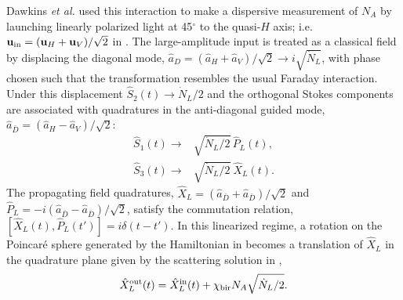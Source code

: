 \documentclass[preprint,aps,pra,onecolumn]{revtex4-1} %
\newcommand{\inp}{{\rm in}}
\newcommand{\chibir}{\chi_{\rm bir}}
\begin{document}

Dawkins {\em et al.} \cite{dawkins_dispersive_2011} used this interaction to make a dispersive measurement of $N_A$ by launching linearly polarized light at 45$^\circ$ to the quasi-$H$ axis; i.e. $\mbf{u}_\inp = (\mbf{u}_H + \mbf{u}_V )/\sqrt{2}$ in . The large-amplitude input is treated as a classical field by displacing the diagonal mode, $\hat{a}_D = (\hat{a}_H + \hat{a}_V)/\sqrt{2} \rightarrow i\sqrt{\dot{N}_L}$, with phase chosen such that the transformation resembles the usual Faraday interaction. Under this displacement $\hat{S}_2(t) \rightarrow \dot{N}_L/2$ and the orthogonal Stokes components are associated with quadratures in the anti-diagonal guided mode, $\hat{a}_{\bar{D}} = (\hat{a}_H - \hat{a}_V)/\sqrt{2}$:
	\begin{align}
		\hat{S}_1(t) \rightarrow & \sqrt{\dot{N}_L/2} \, \hat{P}_L(t), \\ 
		\hat{S}_3(t) \rightarrow & \sqrt{\dot{N}_L/2} \ \hat{X}_L(t). \label{Eq::Xquad}
\end{align}
The propagating field quadratures, $\hat{X}_L = (\hat{a}_{\bar{D}} + \hat{a}_{\bar{D}})/\sqrt{2}$ and $\hat{P}_L = -i(\hat{a}_{\bar{D}} - \hat{a}_{\bar{D}})/\sqrt{2}$, satisfy the commutation relation, $[ \hat{X}_L(t), \hat{P}_L(t') ] =i\delta(t-t').$ In this linearized regime, a rotation on the Poincar\'{e} sphere generated by the Hamiltonian in  becomes a translation of $\hat{X}_L$ in the quadrature plane given by the scattering solution in ,
	\begin{align} \label{Eq:XoutAtomNumber}
		\hat{X}_L^{\rm out}(t) = \hat{X}_L^{\rm in}(t) +  \chibir N_A \sqrt{ \dot{N}_L/2}.
	\end{align}
\end{document}
